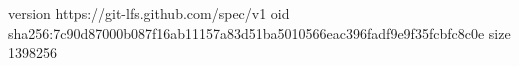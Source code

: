 version https://git-lfs.github.com/spec/v1
oid sha256:7c90d87000b087f16ab11157a83d51ba5010566eac396fadf9e9f35fcbfc8c0e
size 1398256
